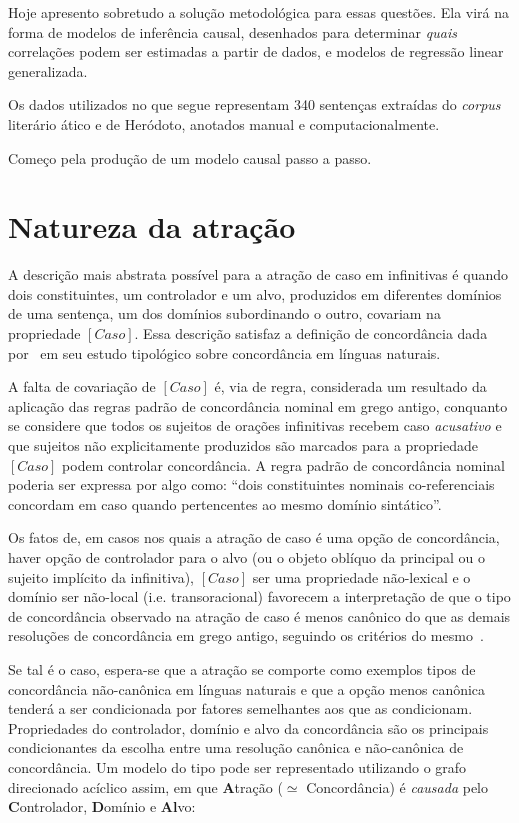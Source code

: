 \documentclass[a4paper, 12pt, article]{memoir}
\begin{document}
Hoje apresento sobretudo a solução metodológica para essas questões.
Ela virá na forma de modelos de inferência causal, desenhados para determinar
\emph{quais} correlações podem ser estimadas a partir de dados, e modelos de
regressão linear generalizada.

Os dados utilizados no que segue representam 340 sentenças extraídas do
\emph{corpus} literário ático e de Heródoto, anotados manual e
computacionalmente.


Começo pela produção de um modelo causal passo a passo.

\chapter{Natureza da atração} %

A descrição mais abstrata possível para a atração de caso em infinitivas é
quando dois constituintes, um controlador e um alvo, produzidos em diferentes
domínios de uma sentença, um dos domínios subordinando o outro, covariam na
propriedade $[Caso]$.
Essa descrição satisfaz a definição de concordância dada
por~\textcite[4--7]{Corbett2006} em seu estudo tipológico sobre concordância em
línguas naturais.

A falta de covariação de $[Caso]$ é, via de regra, considerada um resultado da
aplicação das regras padrão de concordância nominal em grego antigo, conquanto
se considere que todos os sujeitos de orações infinitivas recebem caso
\emph{acusativo} e que sujeitos não explicitamente produzidos são marcados para
a propriedade $[Caso]$ podem controlar concordância.
A regra padrão de concordância nominal poderia ser expressa por algo como:
``dois constituintes nominais co\hyp{}referenciais concordam em caso quando
pertencentes ao mesmo domínio sintático''.

Os fatos de, em casos nos quais a atração de caso é uma opção de
concordância, haver opção de controlador para o alvo (ou o objeto oblíquo da
principal ou o sujeito implícito da infinitiva), $[Caso]$ ser uma propriedade
não\hyp{}lexical e o domínio ser não\hyp{}local (i.e. transoracional) favorecem
a interpretação de que o tipo de concordância observado na atração de caso é
menos canônico do que as demais resoluções de concordância em grego antigo,
seguindo os critérios do mesmo~\textcite[pp. 8ff.]{Corbett2006}.

Se tal é o caso, espera-se que a atração se comporte como exemplos tipos de
concordância não\hyp{}canônica em línguas naturais e que a opção menos canônica
tenderá a ser condicionada por fatores semelhantes aos que as condicionam.
Propriedades do controlador, domínio e alvo da concordância são os
principais condicionantes da escolha entre uma resolução canônica e
não\hyp{}canônica de concordância.
Um modelo do tipo pode ser representado utilizando o grafo direcionado acíclico
assim, em que
\textbf{A}tração ($\simeq$ Concordância) é \emph{causada}
pelo \textbf{C}ontrolador, \textbf{D}omínio e \textbf{Al}vo:
\end{document}
